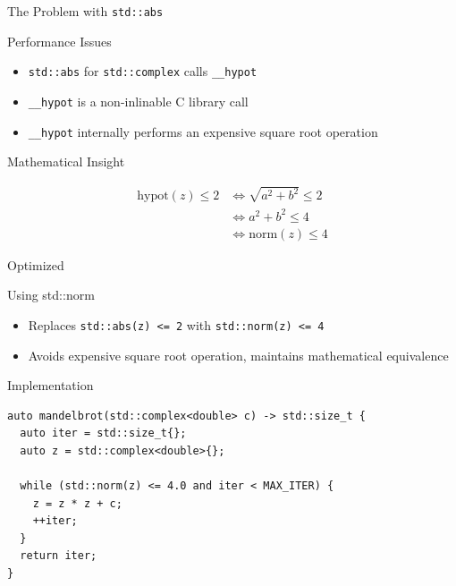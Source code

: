 \documentclass{beamer}
\begin{document}
\begin{frame}{The Problem with \texttt{std::abs}}
    \begin{block}{Performance Issues}
        \begin{itemize}
            \item \texttt{std::abs} for \texttt{std::complex} calls \texttt{\_\_hypot}
            \item \texttt{\_\_hypot} is a non-inlinable C library call
            \item \texttt{\_\_hypot} internally performs an expensive square root operation
        \end{itemize}
    \end{block}
    
    \begin{block}{Mathematical Insight}
        \begin{minipage}{\linewidth}
        \begin{align*}
            \mathrm{hypot}(z) \le 2 &\Leftrightarrow \sqrt{a^2 + b^2} \le 2 \\
                                    &\Leftrightarrow a^2 + b^2 \le 4 \\
                                    &\Leftrightarrow \mathrm{norm}(z) \le 4
        \end{align*}
        \end{minipage}
    \end{block}
    

\end{frame}

\begin{frame}[fragile]{Optimized}
    \begin{block}{Using std::norm}
        \begin{itemize}
            \item Replaces \texttt{std::abs(z) <= 2} with \texttt{std::norm(z) <= 4}
            \item Avoids expensive square root operation, maintains mathematical equivalence
        \end{itemize}
    \end{block}
    \begin{exampleblock}{Implementation}
        \begin{verbatim}
auto mandelbrot(std::complex<double> c) -> std::size_t {
  auto iter = std::size_t{};
  auto z = std::complex<double>{};
  
  while (std::norm(z) <= 4.0 and iter < MAX_ITER) {
    z = z * z + c;
    ++iter;
  }
  return iter;
}
        \end{verbatim}
    \end{exampleblock}
\end{frame}
\end{document}
